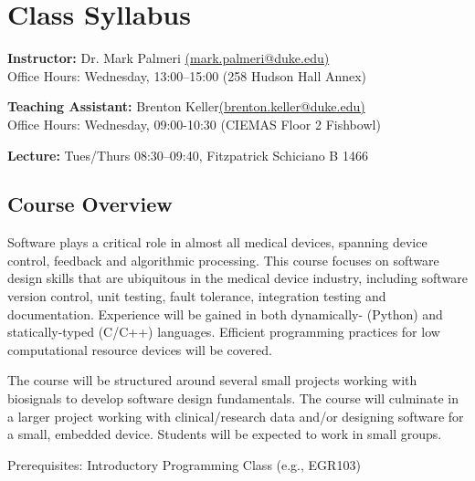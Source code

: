 



\section*{Class Syllabus}

{\bf Instructor:} Dr. Mark Palmeri \href{mailto:mark.palmeri@duke.edu}{(mark.palmeri@duke.edu)}\\
Office Hours: Wednesday, 13:00--15:00 (258 Hudson Hall Annex)

{\bf Teaching Assistant:} Brenton Keller\href{mailto:brenton.keller@duke.edu}{(brenton.keller@duke.edu)}\\
Office Hours: Wednesday, 09:00-10:30 (CIEMAS Floor 2 Fishbowl)

{\bf Lecture:} Tues/Thurs 08:30--09:40, Fitzpatrick Schiciano B 1466

\subsection*{Course Overview}
Software plays a critical role in almost all medical devices, spanning device control, feedback and algorithmic processing.  This course focuses on software design skills that are ubiquitous in the medical device industry, including software version control, unit testing, fault tolerance, integration testing and documentation.  Experience will be gained in both dynamically- (Python) and statically-typed (C/C++) languages.  Efficient programming practices for low computational resource devices will be covered.

The course will be structured around several small projects working with biosignals to develop software design fundamentals.  The course will culminate in a larger project working with clinical/research data and/or designing software for a small, embedded device.  Students will be expected to work in small groups.

Prerequisites: Introductory Programming Class (e.g., EGR103)


